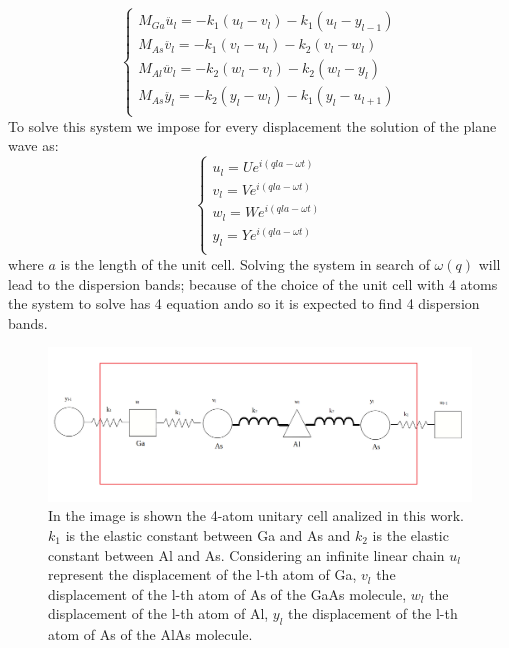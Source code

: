 \documentclass{article}
\begin{document}
\begin{equation}
	\begin{cases}
	M_{Ga}\ddot{u_l} = -k_1(u_l-v_l) - k_1(u_l-y_{l-1}) \\
	M_{As}\ddot{v_l} = -k_1(v_l-u_l) - k_2(v_l-w_l) \\
	M_{Al}\ddot{w_l} = -k_2(w_l-v_l) - k_2(w_l-y_l) \\
	M_{As}\ddot{y_l} = -k_2(y_l-w_l) - k_1(y_l-u_{l+1}) \\
	\end{cases}
	\label{sistema}	
\end{equation}
To solve this system we impose for every displacement the solution of the plane wave as:
\begin{equation}
	\begin{cases}
	u_l = Ue^{i(qla-\omega t)} \\
	v_l = Ve^{i(qla-\omega t)} \\
	w_l = We^{i(qla-\omega t)} \\
	y_l = Ye^{i(qla-\omega t)} \\
	\end{cases}
	\label{onde piane}
\end{equation}
where $a$ is the length of the unit cell.
Solving the system in search of $\omega(q)$ will lead to the dispersion bands; because of the choice of the unit cell with 4 atoms the system to solve has 4 equation ando so it is expected to find 4 dispersion bands.  


\begin{figure}
	\centering
	\includegraphics[width=0.7\linewidth]{cella.png}
	\caption{In the image is shown the 4-atom unitary cell analized in this work.$k_1$ is the elastic constant between Ga and As and $k_2$ is the elastic constant between Al and As. Considering an infinite linear chain $u_l$ represent the displacement of the l-th atom of Ga, $v_l$ the displacement of the l-th atom of As of the GaAs molecule, $w_l$ the displacement of the l-th atom of Al, $y_l$ the displacement of the l-th atom of As of the AlAs molecule.   }
	\label{fig:cella}
\end{figure}
\end{document}
